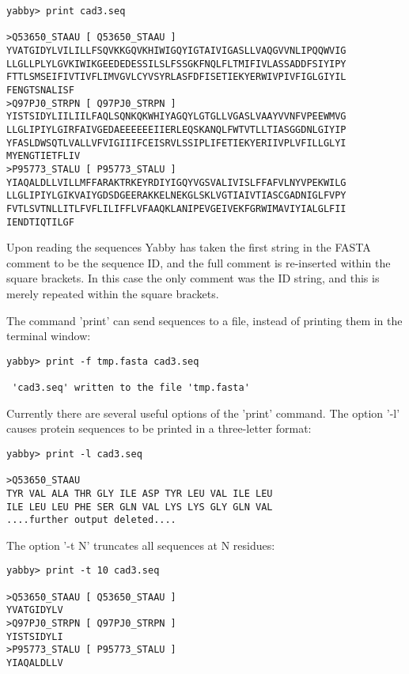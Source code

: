 \begin{verbatim}
yabby> print cad3.seq

>Q53650_STAAU [ Q53650_STAAU ]
YVATGIDYLVILILLFSQVKKGQVKHIWIGQYIGTAIVIGASLLVAQGVVNLIPQQWVIG
LLGLLPLYLGVKIWIKGEEDEDESSILSLFSSGKFNQLFLTMIFIVLASSADDFSIYIPY
FTTLSMSEIFIVTIVFLIMVGVLCYVSYRLASFDFISETIEKYERWIVPIVFIGLGIYIL
FENGTSNALISF
>Q97PJ0_STRPN [ Q97PJ0_STRPN ]
YISTSIDYLIILIILFAQLSQNKQKWHIYAGQYLGTGLLVGASLVAAYVVNFVPEEWMVG
LLGLIPIYLGIRFAIVGEDAEEEEEEIIERLEQSKANQLFWTVTLLTIASGGDNLGIYIP
YFASLDWSQTLVALLVFVIGIIIFCEISRVLSSIPLIFETIEKYERIIVPLVFILLGLYI
MYENGTIETFLIV
>P95773_STALU [ P95773_STALU ]
YIAQALDLLVILLMFFARAKTRKEYRDIYIGQYVGSVALIVISLFFAFVLNYVPEKWILG
LLGLIPIYLGIKVAIYGDSDGEERAKKELNEKGLSKLVGTIAIVTIASCGADNIGLFVPY
FVTLSVTNLLITLFVFLILIFFLVFAAQKLANIPEVGEIVEKFGRWIMAVIYIALGLFII
IENDTIQTILGF
\end{verbatim}

Upon reading the sequences Yabby has taken the first string
in the FASTA comment to be the sequence ID, and the full
comment is re-inserted within the square brackets. In this
case the only comment was the ID string, and this is merely
repeated within the square brackets. 

The command 'print' can send sequences to a file, instead
of printing them in the terminal window:

\begin{verbatim}
yabby> print -f tmp.fasta cad3.seq

 'cad3.seq' written to the file 'tmp.fasta'
\end{verbatim}

Currently there are several useful options of the 'print'
command. The option '-l' causes protein sequences to be
printed in a three-letter format:

\begin{verbatim}
yabby> print -l cad3.seq

>Q53650_STAAU
TYR VAL ALA THR GLY ILE ASP TYR LEU VAL ILE LEU 
ILE LEU LEU PHE SER GLN VAL LYS LYS GLY GLN VAL 
....further output deleted....
\end{verbatim}

The option '-t N' truncates all sequences at N residues: 

\begin{verbatim}
yabby> print -t 10 cad3.seq

>Q53650_STAAU [ Q53650_STAAU ]
YVATGIDYLV
>Q97PJ0_STRPN [ Q97PJ0_STRPN ]
YISTSIDYLI
>P95773_STALU [ P95773_STALU ]
YIAQALDLLV
\end{verbatim}

